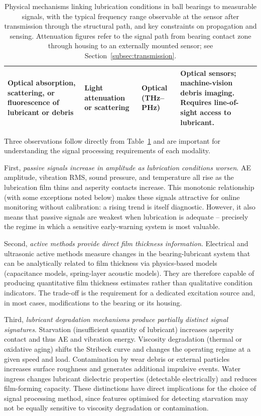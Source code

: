 \begin{table}[H]
\begin{tabularx}{\linewidth}{| >{\raggedright\arraybackslash}p{2.3cm} | >{\raggedright\arraybackslash}p{2.2cm} | >{\raggedright\arraybackslash}p{1.9cm} | X |}
\hline
Optical absorption, scattering, or fluorescence of lubricant or debris & Light attenuation or scattering & Optical (THz--PHz) & Optical sensors; machine-vision debris imaging. Requires line-of-sight access to lubricant. \\
\hline
\end{tabularx}
\caption{Physical mechanisms linking lubrication conditions in ball bearings to measurable signals, with the typical frequency range observable at the sensor after transmission through the structural path, and key constraints on propagation and sensing. Attenuation figures refer to the signal path from bearing contact zone through housing to an externally mounted sensor; see Section~\ref{subsec:transmission}.}
\label{tab:signal_origins}
\end{table}

Three observations follow directly from Table~\ref{tab:signal_origins} and are important for understanding the signal processing requirements of each modality.

First, \textit{passive signals increase in amplitude as lubrication conditions worsen}. AE amplitude, vibration RMS, sound pressure, and temperature all rise as the lubrication film thins and asperity contacts increase. This monotonic relationship (with some exceptions noted below) makes these signals attractive for online monitoring without calibration: a rising trend is itself diagnostic. However, it also means that passive signals are weakest when lubrication is adequate -- precisely the regime in which a sensitive early-warning system is most valuable.

Second, \textit{active methods provide direct film thickness information}. Electrical and ultrasonic active methods measure changes in the bearing-lubricant system that can be analytically related to film thickness via physics-based models (capacitance models, spring-layer acoustic models). They are therefore capable of producing quantitative film thickness estimates rather than qualitative condition indicators. The trade-off is the requirement for a dedicated excitation source and, in most cases, modifications to the bearing or its housing.

Third, \textit{lubricant degradation mechanisms produce partially distinct signal signatures}. Starvation (insufficient quantity of lubricant) increases asperity contact and thus AE and vibration energy. Viscosity degradation (thermal or oxidative aging) shifts the Stribeck curve and changes the operating regime at a given speed and load. Contamination by wear debris or external particles increases surface roughness and generates additional impulsive events. Water ingress changes lubricant dielectric properties (detectable electrically) and reduces film-forming capacity. These distinctions have direct implications for the choice of signal processing method, since features optimised for detecting starvation may not be equally sensitive to viscosity degradation or contamination.


